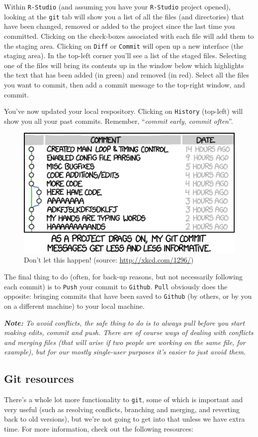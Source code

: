 \documentclass[12pt,letterpaper]{article}
\begin{document}
Within \texttt{R-Studio} (and assuming you have your \texttt{R-Studio} project opened), looking at the \texttt{git} tab will show you a list of all the files (and directories) that have been changed, removed or added to the project since the last time you committed.  Clicking on the check-boxes associated with each file will add them to the staging area.  Clicking on \texttt{Diff} or \texttt{Commit} will open up a new interface (the staging area).  In the top-left corner you'll see a list of the staged files.  Selecting one of the files will bring its contents up in the window below which highlights the text that has been added (in green) and removed (in red).  Select all the files you want to commit, then add a commit message to the top-right window, and commit.  

You've now updated your local respository.  Clicking on \texttt{History} (top-left) will show you all your past commits.  Remember, ``\emph{commit early, commit often}''.


\begin{figure}
	\centering
	\includegraphics[width=0.5\linewidth]{figs/xkcd_git_commit.png}
	\caption{Don't let this happen!  (source: \url{http://xkcd.com/1296/})}
	\label{fig:commit_messages}
\end{figure}

The final thing to do (often, for back-up reasons, but not necessarily following each commit) is to \texttt{Push} your commit to \texttt{Github}.  \texttt{Pull} obviously does the opposite: bringing commits that have been saved to \texttt{Github} (by others, or by you on a different machine) to your local machine.

\emph{ \textbf{Note:}  To avoid conflicts, the safe thing to do is to always pull before you start making edits, commit and push.  There are of course ways of dealing with conflicts and merging files (that will arise if two people are working on the same file, for example), but for our mostly single-user purposes it's easier to just avoid them.}


\subsection{Git resources}
There's a whole lot more functionality to \texttt{git}, some of which is important and very useful (such as resolving conflicts, branching and merging, and reverting back to old versions), but we're not going to get into that unless we have extra time.  For more information, check out the following resources:
\end{document}
